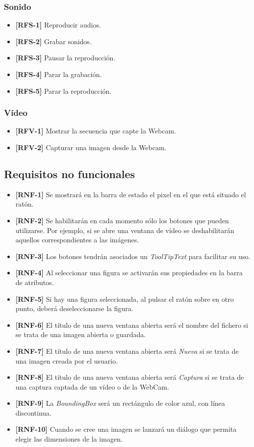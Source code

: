 \subsubsection{Sonido}
\begin{itemize}
\item{\textbf{[RFS-1]} Reproducir audios.}
\item{\textbf{[RFS-2]} Grabar sonidos.}
\item{\textbf{[RFS-3]} Pausar la reproducción.}
\item{\textbf{[RFS-4]} Parar la grabación.}
\item{\textbf{[RFS-5]} Parar la reproducción.}
\end{itemize}
\subsubsection{Vídeo}
\begin{itemize}
\item{\textbf{[RFV-1]} Mostrar la secuencia que capte la Webcam.}
\item{\textbf{[RFV-2]} Capturar una imagen desde la Webcam.}
\end{itemize}
\subsection{Requisitos no funcionales}
\begin{itemize}
\item{\textbf{[RNF-1]} Se mostrará en la barra de estado el pixel en el que está situado el ratón.}
\item{\textbf{[RNF-2]} Se habilitarán en cada momento sólo los botones que pueden utilizarse. Por ejemplo, si se abre una ventana de vídeo se deshabilitarán aquellos correspondientes a las imágenes.}
\item{\textbf{[RNF-3]} Los botones tendrán asociados un \textit{ToolTipText} para facilitar su uso.}
\item{\textbf{[RNF-4]} Al seleccionar una figura se activarán sus propiedades en la barra de atributos.}
\item{\textbf{[RNF-5]} Si hay una figura seleccionada, al pulsar el ratón sobre en otro punto, deberá deseleccionarse la figura.}
\item{\textbf{[RNF-6]} El título de una nueva ventana abierta será el nombre del fichero si se trata de una imagen abierta o guardada.}
\item{\textbf{[RNF-7]} El título de una nueva ventana abierta será \textit{Nueva} si se trata de una imagen creada por el usuario.}
\item{\textbf{[RNF-8]} El título de una nueva ventana abierta será \textit{Captura} si se trata de una captura captada de un vídeo o de la WebCam.}
\item{\textbf{[RNF-9]} La \textit{BoundingBox} será un rectángulo de color azul, con línea discontinua.}
\item{\textbf{[RNF-10]} Cuando se cree una imagen se lanzará un diálogo que permita elegir las dimensiones de la imagen.}

\end{itemize}
